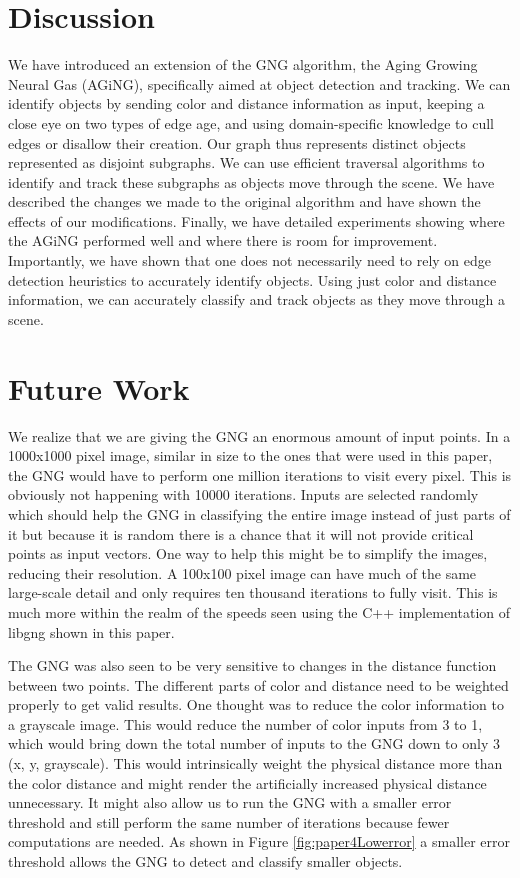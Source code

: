 \documentclass{article}
\renewcommand{\|}{\origbar} %
\begin{document}
\section{Discussion}
\label{sec:discussion}

We have introduced an extension of the GNG algorithm, the Aging Growing Neural Gas (AGiNG), specifically aimed at  object detection and tracking. We can identify objects by sending color and distance information as input, keeping a close eye on two types of edge age, and using domain-specific knowledge to cull edges or disallow their creation. Our graph thus represents distinct objects represented as disjoint subgraphs. We can use efficient traversal algorithms to identify and track these subgraphs as objects move through the scene. We have described the changes we made to the original algorithm and have shown the effects of our modifications. Finally, we have detailed experiments showing where the AGiNG performed well and where there is room for improvement. Importantly, we have shown that one does not necessarily need to rely on edge detection heuristics to accurately identify objects. Using just color and distance information, we can accurately classify and track objects as they move through a scene.

\section{Future Work}
\label{sec:future}

We realize that we are giving the GNG an enormous amount of input points. In a 1000x1000 pixel image, similar in size to the ones that were used in this paper, the GNG would have to perform one million iterations to visit every pixel. This is obviously not happening with 10000 iterations. Inputs are selected randomly which should help the GNG in classifying the entire image instead of just parts of it but because it is random there is a chance that it will not provide critical points as input vectors. One way to help this might be to simplify the images, reducing their resolution. A 100x100 pixel image can have much of the same large-scale detail and only requires ten thousand iterations to fully visit. This is much more within the realm of the speeds seen using the C++ implementation of libgng shown in this paper.

The GNG was also seen to be very sensitive to changes in the distance function between two points. The different parts of color and distance need to be weighted properly to get valid results. One thought was to reduce the color information to a grayscale image. This would reduce the number of color inputs from 3 to 1, which would bring down the total number of inputs to the GNG down to only 3 (x, y, grayscale). This would intrinsically weight the physical distance more than the color distance and might render the artificially increased physical distance unnecessary. It might also allow us to run the GNG with a smaller error threshold and still perform the same number of iterations because fewer computations are needed. As shown in Figure \ref{fig:paper4Lowerror} a smaller error threshold allows the GNG to detect and classify smaller objects.
\end{document}
